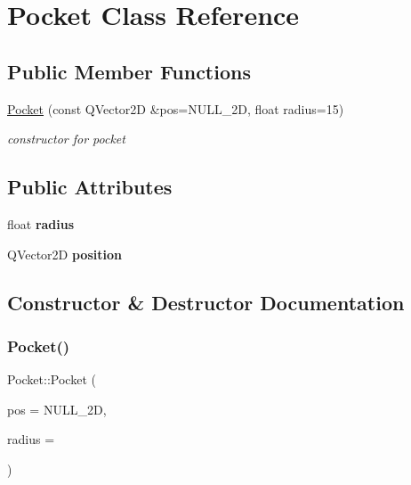 \hypertarget{class_pocket}{}\section{Pocket Class Reference}
\label{class_pocket}
\subsection*{Public Member Functions}
\begin{DoxyCompactItemize}
\item 
\mbox{\hyperlink{class_pocket_a8097676f321bbe9f8827b3e1bf970b85}{Pocket}} (const Q\+Vector2D \&pos=N\+U\+L\+L\+\_\+2D, float radius=15)
\begin{DoxyCompactList}\small\item\em constructor for pocket \end{DoxyCompactList}\end{DoxyCompactItemize}
\subsection*{Public Attributes}
\begin{DoxyCompactItemize}
\item 
\mbox{\label{class_pocket_abed1a0b9e00fd3701a94ef36b87c9ba4}} 
float {\bfseries radius}
\item 
\mbox{\label{class_pocket_a68d67c1e98642a2e8f47192ded1abb97}} 
Q\+Vector2D {\bfseries position}
\end{DoxyCompactItemize}


\subsection{Constructor \& Destructor Documentation}
\mbox{\label{class_pocket_a8097676f321bbe9f8827b3e1bf970b85}} 
\subsubsection{\texorpdfstring{Pocket()}{Pocket()}}
{\footnotesize\ttfamily Pocket\+::\+Pocket (\begin{DoxyParamCaption}\item[{const Q\+Vector2D \&}]{pos = {\ttfamily NULL\+\_\+2D},  }\item[{float}]{radius = {} }\end{DoxyParamCaption})}



